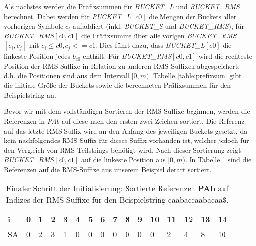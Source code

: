 Als nächstes werden die Präfixsummen für \textit{BUCK\-ET\_L} und \textit{BUCK\-ET\_RMS} berechnet. Dabei werden für \textit{BUCKET\_L}$[c0]$ die Mengen der Buckets aller vorherigen Symbole $c_i$ aufaddiert (inkl. \textit{BUCKET\_S} und \textit{BUCKET\_RMS}), für \textit{BUCKET\_RMS}$[c0,c1]$ die Präfixsumme über alle vorigen \textit{BUCK\-ET\_RMS}$[c_i,c_j]$  mit $c_i \leq c0, c_j <= c1$. Dies führt dazu, dass \textit{BUCKET\_L$[c0]$} die linkeste Position jedes $b_{c0}$ enthält. Für \textit{BUCKET\_RMS$[c0,c1]$} wird die rechteste Position der RMS-Suffixe in Relation zu anderen RMS-Suffixen abgespeichert, d.h. die Positionen sind aus dem Intervall $[0,m)$. Tabelle \ref{table:prefixsum} gibt die initiale Größe der Buckets sowie die berechneten Präfixsummen für den Beispielstring an.

Bevor wir mit dem vollständigen Sortieren der RMS-Suffixe beginnen, werden die Referenzen in \textit{PAb} auf diese nach den ersten zwei Zeichen sortiert. Die Referenz auf das letzte RMS-Suffix wird an den Anfang des jeweiligen Buckets gesetzt, da kein nachfolgendes RMS-Suffix für dieses Suffix vorhanden ist, welcher jedoch für den Vergleich von RMS-Teilstrings benötigt wird. Nach dieser Sortierung zeigt \textit{BUCKET\_RMS$[c0,c1]$} auf die linkeste Position aus $[0,m)$. In Tabelle \ref{table:bucket-order} sind die Referenzen auf die RMS-Suffixe aus unserem Beispiel derart sortiert.

\begin{table}
	\centering
	\begin{tabular}[t]{l|lllllllllllllll}
		i  & 0                         & 1                         & 2                         & 3                         & 4 & 5 & 6 & 7 & 8 & 9 & 10 & 11 & 12 & 13 & 14 \\ \hline
		SA & \cellcolor[HTML]{32CB00}0 & \cellcolor[HTML]{32CB00}2 & \cellcolor[HTML]{32CB00}3 & \cellcolor[HTML]{32CB00}1 & 0 & 0 & 0 & 0 & 0 & 0 & 0  & 2  & 4  & 8  & 10 \\ \hline
	\end{tabular}	\newline

	\caption{Finaler Schritt der Initialisierung: Sortierte Referenzen \textbf{PAb} auf Indizes der RMS-Suffixe für den Beispielstring caabaccaabacaa\$.}
	\label{table:bucket-order}
\end{table}

